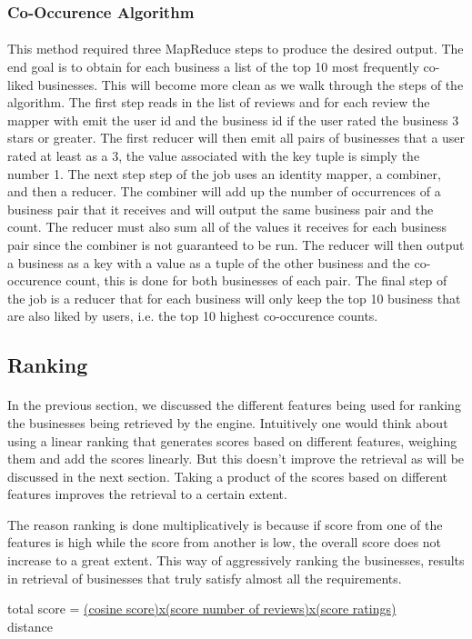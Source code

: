 \documentclass[paper=letter, fontsize=15pt]{article} %
\begin{document}
\subsubsection{Co-Occurence Algorithm}
\paragraph{}This method required three MapReduce steps to produce the desired output. The end goal is to obtain for each business a list of the top 10 most frequently co-liked businesses. This will become more clean as we walk through the steps of the algorithm. The first step reads in the list of reviews and for each review the mapper with emit the user id and the business id if the user rated the business 3 stars or greater. The first reducer will then emit all pairs of businesses that a user rated at least as a 3, the value associated with the key tuple is simply the number 1. The next step step of the job uses an identity mapper, a combiner, and then a reducer. The combiner will add up the number of occurrences of a business pair that it receives and will output the same business pair and the count. The reducer must also sum all of the values it receives for each business pair since the combiner is not guaranteed to be run. The reducer will then output a business as a key with a value as a tuple of the other business and the co-occurence count, this is done for both businesses of each pair. The final step of the job is a reducer that for each business will only keep the top 10 business that are also liked by users, i.e. the top 10 highest co-occurence counts. 

\subsection{Ranking}
\paragraph{}In the previous section, we discussed the different features being used for ranking the businesses being retrieved by the engine. Intuitively one would think about using a linear ranking that generates scores based on different features, weighing them and add the scores linearly. But this doesn't improve the retrieval as will be discussed in the next section. Taking a product of the scores based on different features improves the retrieval to a certain extent. 

The reason ranking is done multiplicatively is because if score from one of the features is high while the score from another is low, the overall score does not increase to a great extent. This way of aggressively ranking the businesses, results in retrieval of businesses that truly satisfy almost all the requirements. 
\begin{center}
total score = \underline{(cosine score)x(score number of reviews)x(score ratings)}
                             \\  distance

\end{center}
\end{document}

